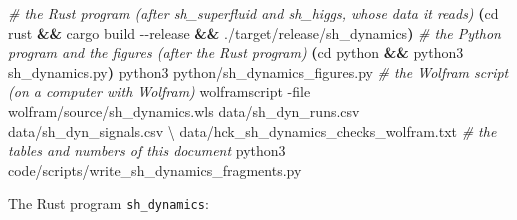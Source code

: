 \documentclass[
  10pt,
]{article}
\newenvironment{Shaded}{}{}
\newcommand{\AttributeTok}[1]{\textcolor[rgb]{0.49,0.56,0.16}{#1}}
\newcommand{\BuiltInTok}[1]{\textcolor[rgb]{0.00,0.50,0.00}{#1}}
\newcommand{\CommentTok}[1]{\textcolor[rgb]{0.38,0.63,0.69}{\textit{#1}}}
\newcommand{\DataTypeTok}[1]{\textcolor[rgb]{0.56,0.13,0.00}{#1}}
\newcommand{\ExtensionTok}[1]{#1}
\newcommand{\KeywordTok}[1]{\textcolor[rgb]{0.00,0.44,0.13}{\textbf{#1}}}
\newcommand{\NormalTok}[1]{#1}
\begin{document}
\begin{Shaded}
\begin{Highlighting}[]
\CommentTok{\# the Rust program (after sh\_superfluid and sh\_higgs, whose data it reads)}
\KeywordTok{(}\BuiltInTok{cd}\NormalTok{ rust }\KeywordTok{\&\&} \ExtensionTok{cargo}\NormalTok{ build }\AttributeTok{{-}{-}release} \KeywordTok{\&\&} \ExtensionTok{./target/release/sh\_dynamics}\KeywordTok{)}
\CommentTok{\# the Python program and the figures (after the Rust program)}
\KeywordTok{(}\BuiltInTok{cd}\NormalTok{ python }\KeywordTok{\&\&} \ExtensionTok{python3}\NormalTok{ sh\_dynamics.py}\KeywordTok{)}
\ExtensionTok{python3}\NormalTok{ python/sh\_dynamics\_figures.py}
\CommentTok{\# the Wolfram script (on a computer with Wolfram)}
\ExtensionTok{wolframscript} \AttributeTok{{-}file}\NormalTok{ wolfram/source/sh\_dynamics.wls data/sh\_dyn\_runs.csv data/sh\_dyn\_signals.csv }\DataTypeTok{\textbackslash{}}
\NormalTok{    data/hck\_sh\_dynamics\_checks\_wolfram.txt}
\CommentTok{\# the tables and numbers of this document}
\ExtensionTok{python3}\NormalTok{ code/scripts/write\_sh\_dynamics\_fragments.py}
\end{Highlighting}
\end{Shaded}

The Rust program \texttt{sh\_dynamics}:
\end{document}
